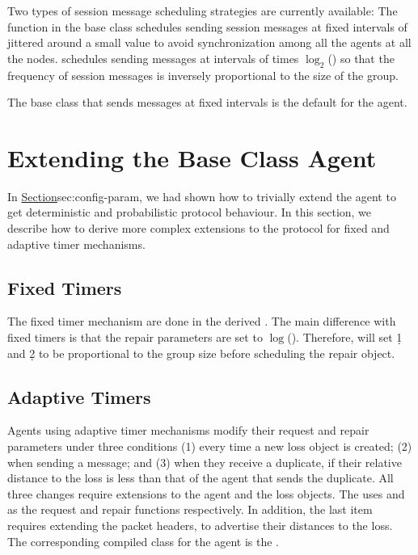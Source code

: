 {Two types of session message scheduling strategies are currently
available:
The function in the base class schedules sending session messages at
fixed intervals of  jittered around a small value
to avoid synchronization among all the agents at all the nodes.
 schedules sending messages
at intervals of  times $\log_2$()
so that the frequency of session messages is inversely proportional to 
the size of the group.

The base class that sends messages at fixed intervals
is the default  for the agent.

\section{Extending the Base Class Agent}
\label{sec:extensions}

In
\href{the earlier section on configuration parameters}{Section}{sec:config-param},
we had shown how to trivially extend the agent to
get deterministic and probabilistic protocol behaviour.
In this section, we describe how to derive more complex
extensions to the protocol for fixed and adaptive timer mechanisms.

\subsection{Fixed Timers}

The fixed timer mechanism are done in
the derived .
The main difference with fixed timers is that
the repair parameters are set to $\log$().
Therefore, 
will set \d1 and \d2 to be proportional to the group size
before scheduling the repair object.

\subsection{Adaptive Timers}

Agents using adaptive timer mechanisms
modify their request and repair parameters under three conditions
(1) every time a new loss object is created;
(2) when sending a message; and
(3) when they receive a duplicate, if their relative distance to the loss
    is less than that of the agent that sends the duplicate.
All three changes require extensions to the agent and the loss objects.
The 
uses  and
as the request and repair functions respectively.
In addition, the last item requires extending the packet headers,
to advertise their distances to the loss.
The corresponding compiled class for the agent is the
.

}
